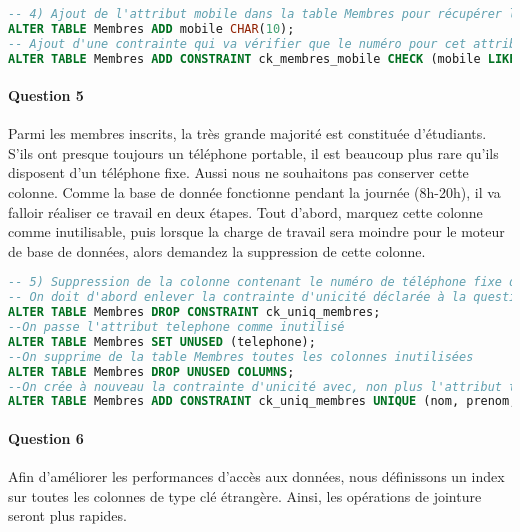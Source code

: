 \documentclass[10pt, oneside]{article}
\begin{document}
\begin{lstlisting}[language=sql, title=Question 4, label=QI4]
-- 4) Ajout de l'attribut mobile dans la table Membres pour récupérer le numero de téléphone portable 
ALTER TABLE Membres ADD mobile CHAR(10);
-- Ajout d'une contrainte qui va vérifier que le numéro pour cet attribut est bien celui d'un portable (commencant par 06)
ALTER TABLE Membres ADD CONSTRAINT ck_membres_mobile CHECK (mobile LIKE '06%');
\end{lstlisting}


\paragraph{Question 5} Parmi les membres inscrits, la très grande majorité est constituée d'étudiants. S'ils ont presque toujours un téléphone portable, il est beaucoup plus rare qu'ils disposent d'un téléphone fixe. Aussi nous ne souhaitons pas conserver cette colonne. Comme la base de donnée fonctionne pendant la journée (8h-20h), il va falloir réaliser ce travail en deux étapes. Tout d'abord, marquez cette colonne comme inutilisable, puis lorsque la charge de travail sera moindre pour le moteur de base de données, alors demandez la suppression de cette colonne.

\begin{lstlisting}[language=sql, title=Question 5, label=QI5]
-- 5) Suppression de la colonne contenant le numéro de téléphone fixe dans la table Membres
-- On doit d'abord enlever la contrainte d'unicité déclarée à la question 3)
ALTER TABLE Membres DROP CONSTRAINT ck_uniq_membres;
--On passe l'attribut telephone comme inutilisé
ALTER TABLE Membres SET UNUSED (telephone);
--On supprime de la table Membres toutes les colonnes inutilisées
ALTER TABLE Membres DROP UNUSED COLUMNS;
--On crée à nouveau la contrainte d'unicité avec, non plus l'attribut téléphone, mais l'attribut mobile
ALTER TABLE Membres ADD CONSTRAINT ck_uniq_membres UNIQUE (nom, prenom, mobile);

\end{lstlisting}


\paragraph{Question 6} Afin d'améliorer les performances d'accès aux données, nous définissons un index sur toutes les colonnes de type clé étrangère. Ainsi, les opérations de jointure seront plus rapides.
\end{document}
